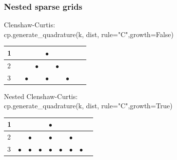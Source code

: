 \documentclass{beamer}
\begin{document}
 
 \begin{frame}
  \frametitle{Nested sparse grids}
 Clenshaw-Curtis:\\
 cp.generate\_quadrature(k, dist, rule="C",growth=False)
  \begin{table}
  \begin{tabular}{lcccccccc}
    1& &&& $\bullet$& &&&  \\\hline
   2 &&&$\bullet$& &$\bullet$&&& \\\hline
   3 &&$\bullet$&&$\bullet$ &&$\bullet$&& \\
   \end{tabular}
  \end{table}
  
  
  Nested Clenshaw-Curtis:\\
  cp.generate\_quadrature(k, dist, rule="C",growth=True)
  \begin{table}
  \begin{tabular}{lcccccccc}
    1& &&& $\bullet$& &&&  \\\hline
   2 &&$\bullet$&& $\bullet$&&$\bullet$ && \\\hline
   3 &$\bullet$&$\bullet$&$\bullet$& $\bullet$&$\bullet$&$\bullet$ &$\bullet$& \\
   \end{tabular}
  \end{table}
 
  \end{frame}
\end{document}
